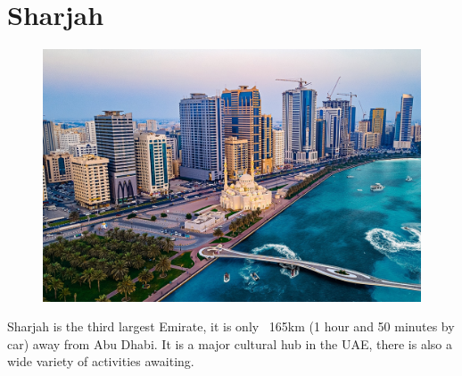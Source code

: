 \section{Sharjah}
\begin{figure}[h!]
 \centering
     \includegraphics[width=0.9\linewidth]{examples/handbook_coling25/local_guide/images/sharjah.png}
\end{figure}

Sharjah is the third largest Emirate, it is only ~165km (1 hour and 50 minutes by car) away from Abu Dhabi.
 It is a major cultural hub in the UAE, there is also a wide variety of activities awaiting. 
